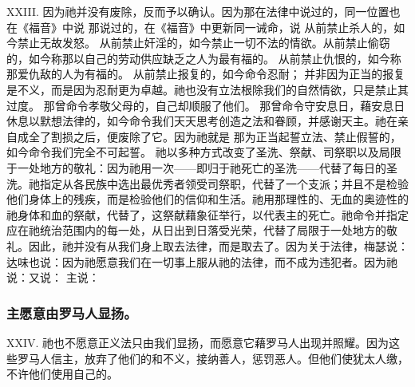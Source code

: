 XXIII. 因为祂并没有废除，反而予以确认。因为那在法律中说过的，同一位置也在《福音》中说 那说过的，在《福音》中更新同一诫命，说 从前禁止杀人的，如今禁止无故发怒。 从前禁止奸淫的，如今禁止一切不法的情欲。从前禁止偷窃的，如今称那以自己的劳动供应缺乏之人为最有福的。 从前禁止仇恨的，如今称那爱仇敌的人为有福的。 从前禁止报复的，如今命令忍耐； 并非因为正当的报复是不义，而是因为忍耐更为卓越。祂也没有立法根除我们的自然情欲，只是禁止其过度。 那曾命令孝敬父母的，自己却顺服了他们。 那曾命令守安息日，藉安息日休息以默想法律的，如今命令我们天天思考创造之法和眷顾，并感谢天主。祂在亲自成全了割损之后，便废除了它。因为祂就是 那为正当起誓立法、禁止假誓的，如今命令我们完全不可起誓。 祂以多种方式改变了圣洗、祭献、司祭职以及局限于一处地方的敬礼：因为祂用一次——即归于祂死亡的圣洗——代替了每日的圣洗。祂指定从各民族中选出最优秀者领受司祭职，代替了一个支派；并且不是检验他们身体上的残疾，而是检验他们的信仰和生活。祂用那理性的、无血的奥迹性的祂身体和血的祭献，代替了，这祭献藉象征举行，以代表主的死亡。祂命令并指定应在祂统治范围内的每一处，从日出到日落受光荣，代替了局限于一处地方的敬礼。因此，祂并没有从我们身上取去法律，而是取去了。因为关于法律，梅瑟说：达味也说：因为祂愿意我们在一切事上服从祂的法律，而不成为违犯者。因为祂说：又说： 主说：\par


\subsubsection{主愿意由罗马人显扬。}

XXIV. 祂也不愿意正义法只由我们显扬，而愿意它藉罗马人出现并照耀。因为这些罗马人信主，放弃了他们的和不义，接纳善人，惩罚恶人。但他们使犹太人缴，不许他们使用自己的。\par


